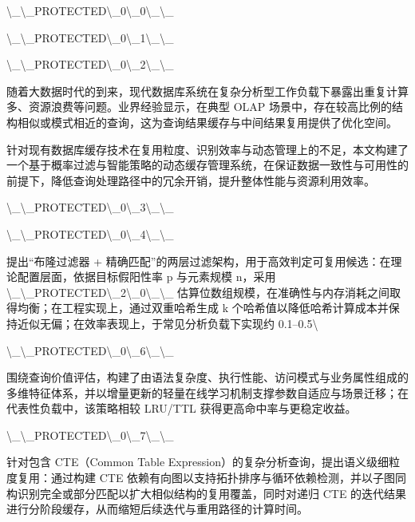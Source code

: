\textbackslash{}_\textbackslash{}_PROTECTED\textbackslash{}_0\textbackslash{}_0\textbackslash{}_\textbackslash{}_

\textbackslash{}_\textbackslash{}_PROTECTED\textbackslash{}_0\textbackslash{}_1\textbackslash{}_\textbackslash{}_

\textbackslash{}_\textbackslash{}_PROTECTED\textbackslash{}_0\textbackslash{}_2\textbackslash{}_\textbackslash{}_

随着大数据时代的到来，现代数据库系统在复杂分析型工作负载下暴露出重复计算多、资源浪费等问题。业界经验显示，在典型 OLAP 场景中，存在较高比例的结构相似或模式相近的查询，这为查询结果缓存与中间结果复用提供了优化空间。

针对现有数据库缓存技术在复用粒度、识别效率与动态管理上的不足，本文构建了一个基于概率过滤与智能策略的动态缓存管理系统，在保证数据一致性与可用性的前提下，降低查询处理路径中的冗余开销，提升整体性能与资源利用效率。

\textbackslash{}_\textbackslash{}_PROTECTED\textbackslash{}_0\textbackslash{}_3\textbackslash{}_\textbackslash{}_

\textbackslash{}_\textbackslash{}_PROTECTED\textbackslash{}_0\textbackslash{}_4\textbackslash{}_\textbackslash{}_

提出“布隆过滤器 + 精确匹配”的两层过滤架构，用于高效判定可复用候选：在理论配置层面，依据目标假阳性率 p 与元素规模 n，采用 \textbackslash{}_\textbackslash{}_PROTECTED\textbackslash{}_2\textbackslash{}_0\textbackslash{}_\textbackslash{}_ 估算位数组规模，在准确性与内存消耗之间取得均衡；在工程实现上，通过双重哈希生成 k 个哈希值以降低哈希计算成本并保持近似无偏；在效率表现上，于常见分析负载下实现约 0.1–0.5\textbackslash{}%

\textbackslash{}_\textbackslash{}_PROTECTED\textbackslash{}_0\textbackslash{}_6\textbackslash{}_\textbackslash{}_

围绕查询价值评估，构建了由语法复杂度、执行性能、访问模式与业务属性组成的多维特征体系，并以增量更新的轻量在线学习机制支撑参数自适应与场景迁移；在代表性负载中，该策略相较 LRU/TTL 获得更高命中率与更稳定收益。

\textbackslash{}_\textbackslash{}_PROTECTED\textbackslash{}_0\textbackslash{}_7\textbackslash{}_\textbackslash{}_

针对包含 CTE（Common Table Expression）的复杂分析查询，提出语义级细粒度复用：通过构建 CTE 依赖有向图以支持拓扑排序与循环依赖检测，并以子图同构识别完全或部分匹配以扩大相似结构的复用覆盖，同时对递归 CTE 的迭代结果进行分阶段缓存，从而缩短后续迭代与重用路径的计算时间。


